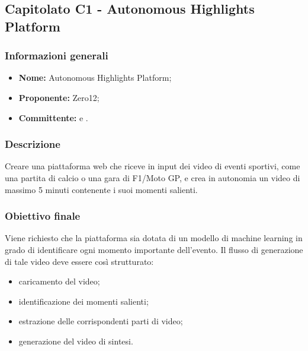 \subsection{Capitolato C1 - Autonomous Highlights Platform}

\subsubsection{Informazioni generali}
	\begin{itemize}
		\item \textbf{Nome:} Autonomous Highlights Platform; 
		\item \textbf{Proponente:} Zero12;
		\item \textbf{Committente:} \TV{} e \RC{}. 
	\end{itemize}

\subsubsection{Descrizione}
Creare una piattaforma web che riceve in input dei video di eventi sportivi, come una partita di calcio o una gara di F1/Moto GP, e crea in autonomia un video di massimo 5 minuti contenente i suoi momenti salienti. 

\subsubsection{Obiettivo finale}
Viene richiesto che la piattaforma sia dotata di un modello di machine learning in grado di identificare ogni momento importante dell’evento.
Il flusso di generazione di tale video deve essere così strutturato:
	\begin{itemize}
		\item caricamento del video;
		\item identificazione dei momenti salienti;
		\item estrazione delle corrispondenti parti di video;
		\item generazione del video di sintesi. 
	\end{itemize}

